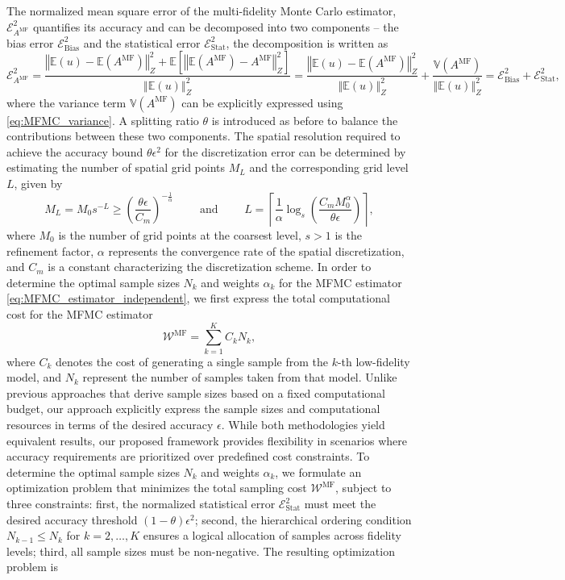 %
The normalized mean square error of the multi-fidelity Monte Carlo estimator, $\mathcal{E}_{A^{\text{MF}}}^2$ quantifies its accuracy and can be decomposed into two components -- the bias error $\mathcal{E}_{\text{Bias}}^2$ and the statistical error $\mathcal{E}_{\text{Stat}}^2$, the decomposition is written as 
%
\[
\mathcal{E}_{A^{\text{MF}}}^2= \frac{\left\Vert\mathbb{E}(u)-\mathbb{E}(A^{\text{MF}}) \right\Vert_{Z}^2+\mathbb E\left[\left\Vert\mathbb{E}(A^{\text{MF}})-A^{\text{MF}} \right\Vert_{Z}^2\right]}{\left\Vert\mathbb{E}(u) \right\Vert_{Z}^2} =\frac{\left\Vert\mathbb{E}(u)-\mathbb{E}(A^{\text{MF}}) \right\Vert_{Z}^2}{\left\Vert\mathbb{E}(u) \right\Vert_{Z}^2}+ \frac{\mathbb{V}\left(A^{\text{MF}}\right)}{\left\Vert\mathbb{E}(u) \right\Vert_{Z}^2}=\mathcal{E}_{\text{Bias}}^2 + \mathcal{E}_{\text{Stat}}^2,
\]
%
where the variance term $\mathbb{V}\left(A^{\text{MF}}\right)$  can be explicitly expressed using \eqref{eq:MFMC_variance}. A splitting ratio $\theta$ is introduced as before to balance the contributions between these two components. The spatial resolution required to achieve the accuracy bound $\theta \epsilon^2$ for the discretization error can be determined by estimating the number of spatial grid points $M_L$ and the corresponding grid level $L$, given by
%
\begin{equation}
    \label{eq:SLSGC_MLS_SpatialGridsNo}
    M_L = M_0s^{-L} \ge \left(\frac{\theta\epsilon}{C_m}\right)^{-\frac 1 {\alpha}} \qquad \text{ and } \qquad     L = \left\lceil \frac{1}{\alpha}\log_s \left(\frac{C_m M_0^\alpha}{\theta\epsilon}\right) \right\rceil,
\end{equation}
%
where $M_0$ is the number of grid points at the coarsest level, $s>1$ is the refinement factor, $\alpha$ represents the convergence rate of the spatial discretization, and $C_m$ is a constant characterizing the discretization scheme. In order to determine the optimal sample sizes $N_k$ and weights $\alpha_k$ for the MFMC estimator \eqref{eq:MFMC_estimator_independent}, we first express the total computational cost for the MFMC estimator
%
\[
\mathcal{W}^{\text{MF}} = \sum_{k=1}^K C_kN_k,
\]
%
where $C_k$ denotes the cost of generating a single sample from the $k$-th low-fidelity model, and $N_k$ represent the number of samples taken from that model. Unlike previous approaches \cite{PeWiGu:2016} that derive sample sizes based on a fixed computational budget, our approach explicitly express the sample sizes and computational resources in terms of the desired accuracy $\epsilon$. While both methodologies yield equivalent results, our proposed framework provides flexibility in scenarios where accuracy requirements are prioritized over predefined cost constraints. To determine the optimal sample sizes $N_k$ and weights $\alpha_k$,  we formulate an optimization problem that minimizes the total sampling cost $\mathcal{W}^{\text{MF}}$, subject to three constraints: first, the normalized statistical error $\mathcal{E}_{\text{Stat}}^2$ must meet the desired accuracy threshold $(1-\theta)\epsilon^2$; second,  the hierarchical ordering condition $N_{k-1}\le N_k$ for $k=2,\ldots, K$ ensures a logical allocation of samples across fidelity levels; third, all sample sizes must be non-negative. The resulting optimization problem is
